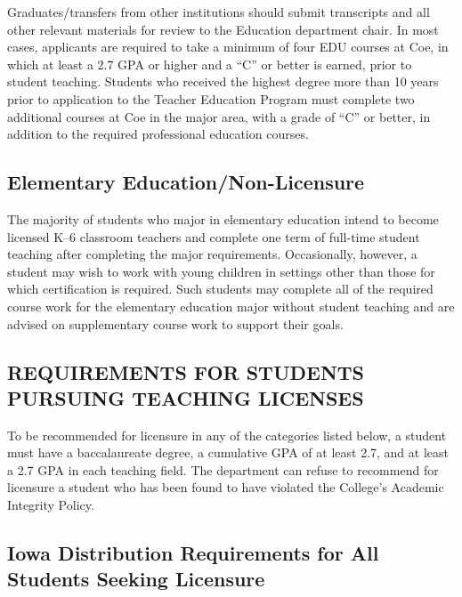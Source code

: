 \documentclass[
  letterpaper,
]{scrbook}
\begin{document}
Graduates/transfers from other institutions should submit transcripts
and all other relevant materials for review to the Education department
chair. In most cases, applicants are required to take a minimum of four
EDU courses at Coe, in which at least a 2.7 GPA or higher and a ``C'' or
better is earned, prior to student teaching. Students who received the
highest degree more than 10 years prior to application to the Teacher
Education Program must complete two additional courses at Coe in the
major area, with a grade of ``C'' or better, in addition to the required
professional education courses.

\hypertarget{elementary-educationnon-licensure}{%
\subsection{Elementary
Education/Non-Licensure}\label{elementary-educationnon-licensure}}

The majority of students who major in elementary education intend to
become licensed K--6 classroom teachers and complete one term of
full-time student teaching after completing the major requirements.
Occasionally, however, a student may wish to work with young children in
settings other than those for which certification is required. Such
students may complete all of the required course work for the elementary
education major without student teaching and are advised on
supplementary course work to support their goals.

\hypertarget{requirements-for-students-pursuing-teaching-licenses}{%
\subsection{REQUIREMENTS FOR STUDENTS PURSUING TEACHING
LICENSES}\label{requirements-for-students-pursuing-teaching-licenses}}

To be recommended for licensure in any of the categories listed below, a
student must have a baccalaureate degree, a cumulative GPA of at least
2.7, and at least a 2.7 GPA in each teaching field. The department can
refuse to recommend for licensure a student who has been found to have
violated the College's Academic Integrity Policy.

\hypertarget{iowa-distribution-requirements-for-all-students-seeking-licensure}{%
\subsection{Iowa Distribution Requirements for All Students Seeking
Licensure}\label{iowa-distribution-requirements-for-all-students-seeking-licensure}}
\end{document}
